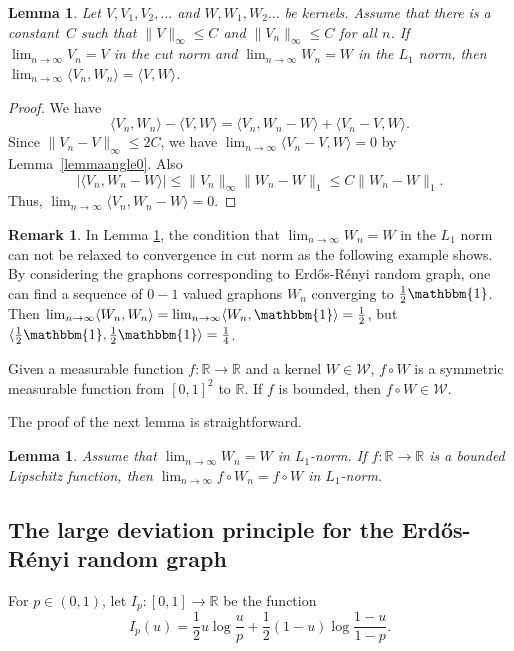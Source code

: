 \documentclass[11pt,a4paper]{article}
\theoremstyle{plain}
\newtheorem{lemma}[theorem]{Lemma}
\theoremstyle{definition}
\newtheorem{remark}[theorem]{Remark}
\begin{document}
\begin{lemma}\label{lemmaangle}
    Let $V,V_1,V_2,\dots$ and $W,W_1,W_2\dots$ be kernels. Assume that there is a constant~$C$ such that $\|V\|_\infty\le C$ and   $\|V_n\|_\infty\le C$ for all $n$. If $\lim_{n\to\infty} V_n=V$ in the cut norm and $\lim_{n\to\infty} W_n=W$ in the $L_1$ norm, then $\lim_{n\to\infty} \langle V_n,W_n\rangle =\langle V,W\rangle$.
\end{lemma}
\begin{proof}
We have
\[\langle V_n,W_n\rangle-\langle V,W\rangle=\langle V_n,W_n-W\rangle+\langle V_n-V,W\rangle.\]
Since $\|V_n-V\|_\infty\le 2C$, we have $\lim_{n\to\infty} \langle V_n-V,W\rangle=0$ by Lemma~\ref{lemmaangle0}. Also
\[|\langle V_n,W_n-W\rangle|\le \|V_n\|_\infty \|W_n-W\|_1\le C\|W_n-W\|_1.\]
Thus, $\lim_{n\to\infty} \langle V_n,W_n-W\rangle=0$.
\end{proof}
\begin{remark}
    In Lemma \ref{lemmaangle}, the condition that $\lim_{n\to\infty} W_n=W$ in the $L_1$ norm can not be relaxed to convergence in cut norm as the following example shows. By considering the graphons corresponding to Erd\H{o}s-R\'enyi random graph, one can find a sequence of $0-1$ valued graphons $W_n$ converging to $\frac{1}2\mathbbm{1}$. Then $\lim_{n\to\infty}\langle W_n,W_n\rangle=\lim_{n\to\infty}\langle W_n,\mathbbm{1}\rangle=\frac{1}2$, but $\langle \frac{1}2\mathbbm{1},\frac{1}2\mathbbm{1}\rangle=\frac{1}4$.
\end{remark}

Given a measurable function $f:\mathbb{R}\to\mathbb{R}$ and a kernel $W\in \mathcal{W}$, $f\circ W$ is a symmetric measurable function from $[0,1]^2$ to $\mathbb{R}$. If $f$ is bounded, then $f\circ W\in \mathcal{W}$.

The proof of the next lemma is straightforward.

\begin{lemma}\label{Lipschitz}
Assume that $\lim_{n\to\infty} W_n=W$ in $L_1$-norm. If $f:\mathbb{R}\to\mathbb{R}$ is a bounded Lipschitz function, then $\lim_{n\to\infty} f\circ W_n=f\circ W$ in $L_1$-norm. 
\end{lemma}




\subsection{The large deviation principle for the Erd\H{o}s-R\'enyi random graph}

For $p\in (0,1)$, let $I_{p}:[0,1]\to \mathbb{R}$ be the function
\[I_{p}(u)=\frac{1}2 u\log\frac{u}{p}+\frac{1}2 (1-u)\log\frac{1-u}{1-p}.\]
\end{document}

